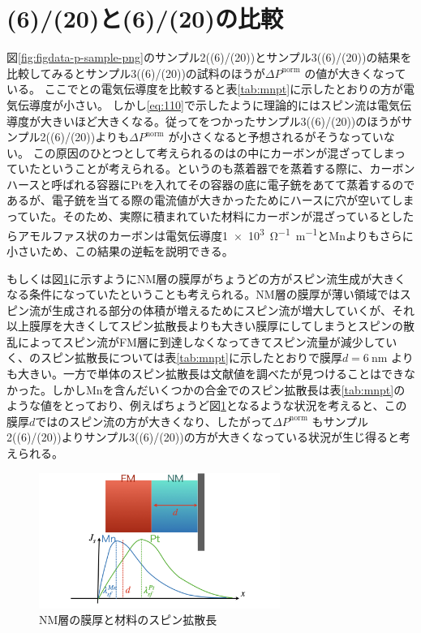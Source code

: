 \documentclass[dvipdfmx,11pt]{jsreport}
\numberwithin{equation}{chapter}
\numberwithin{table}{chapter}
\begin{document}
\section{(6)/(20)と(6)/(20)の比較}
図\ref{fig:figdata-p-sample-png}のサンプル2((6)/(20))とサンプル3((6)/(20))の結果を比較してみるとサンプル3((6)/(20))の試料のほうが$\Delta P^{\text{norm}}$ の値が大きくなっている。
ここでとの電気伝導度を比較すると表\ref{tab:mnpt}に示したとおりの方が電気伝導度が小さい。
しかし\eqref{eq:110}で示したように理論的にはスピン流は電気伝導度が大きいほど大きくなる。従ってをつかったサンプル3((6)/(20))のほうがサンプル2((6)/(20))よりも$\Delta P^{\text{norm}}$ が小さくなると予想されるがそうなっていない。
この原因のひとつとして考えられるのはの中にカーボンが混ざってしまっていたということが考えられる。というのも蒸着器でを蒸着する際に、カーボンハースと呼ばれる容器にPtを入れてその容器の底に電子銃をあてて蒸着するのであるが、電子銃を当てる際の電流値が大きかったためにハースに穴が空いてしまっていた。そのため、実際に積まれていた材料にカーボンが混ざっているとしたらアモルファス状のカーボンは電気伝導度\SI{1e3}{\ohm^{-1}\metre ^{-1}}とMnよりもさらに小さいため、この結果の逆転を説明できる。

もしくは図\ref{fig:adfig-adfig-002-jpeg}に示すようにNM層の膜厚がちょうどの方がスピン流生成が大きくなる条件になっていたということも考えられる。NM層の膜厚が薄い領域ではスピン流が生成される部分の体積が増えるためにスピン流が増大していくが、それ以上膜厚を大きくしてスピン拡散長よりも大きい膜厚にしてしまうとスピンの散乱によってスピン流がFM層に到達しなくなってきてスピン流量が減少していく、のスピン拡散長については表\ref{tab:mnpt}に示したとおりで膜厚$d=\SI{6}{\nano \metre}$ よりも大きい。一方で単体のスピン拡散長は文献値を調べたが見つけることはできなかった。しかしMnを含んだいくつかの合金でのスピン拡散長は表\ref{tab:mnpt}のような値をとっており、例えばちょうど図\ref{fig:adfig-adfig-002-jpeg}となるような状況を考えると、この膜厚$d$ではのスピン流の方が大きくなり、したがって$\Delta P^{\text{norm}}$ もサンプル2((6)/(20))よりサンプル3((6)/(20))の方が大きくなっている状況が生じ得ると考えられる。
\begin{figure}[H]
	\centering
	\includegraphics[width=0.7\textwidth]{adfig/adfig.002.jpeg}
	\caption{NM層の膜厚と材料のスピン拡散長}
	\label{fig:adfig-adfig-002-jpeg}
\end{figure}
\end{document}
